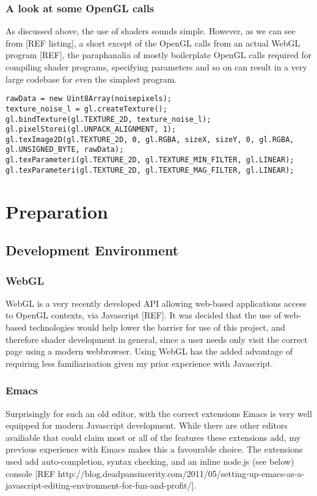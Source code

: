 \documentclass[12pt,twoside,notitlepage]{report}
\begin{document}
\subsection{A look at some OpenGL calls}
As discussed above, the use of shaders sounds simple. However, as we can see from [REF listing], a short except of the OpenGL calls from an actual WebGL program [REF], the paraphanalia of mostly boilerplate OpenGL calls required for compiling shader programs, specifying parameters and so on can result in a very large codebase for even the simplest program.
\begin{lstlisting}
rawData = new Uint8Array(noisepixels);
texture_noise_l = gl.createTexture();
gl.bindTexture(gl.TEXTURE_2D, texture_noise_l);
gl.pixelStorei(gl.UNPACK_ALIGNMENT, 1);
gl.texImage2D(gl.TEXTURE_2D, 0, gl.RGBA, sizeX, sizeY, 0, gl.RGBA, gl.UNSIGNED_BYTE, rawData);
gl.texParameteri(gl.TEXTURE_2D, gl.TEXTURE_MIN_FILTER, gl.LINEAR);
gl.texParameteri(gl.TEXTURE_2D, gl.TEXTURE_MAG_FILTER, gl.LINEAR);
\end{lstlisting}
\cleardoublepage
\chapter{Preparation}

\section{Development Environment}
\subsection{WebGL}
WebGL is a very recently developed API allowing web-based applications access to OpenGL contexts, via Javascript [REF]. It was decided that the use of web-based technologies would help lower the barrier for use of this project, and therefore shader development in general, since a user needs only visit the correct page using a modern webbrowser. Using WebGL has the added advantage of requiring less familiarisation given my prior experience with Javascript.

\subsection{Emacs}
Surprisingly for such an old editor, with the correct extensions Emacs is very well equipped for modern Javascript development. While there are other editors availiable that could claim most or all of the features these extensions add, my previous experience with Emacs makes this a favourable choice. The extensions used add auto-completion, syntax checking, and an inline node.js (see below) console [REF http://blog.deadpansincerity.com/2011/05/setting-up-emacs-as-a-javascript-editing-environment-for-fun-and-profit/].
\end{document}

